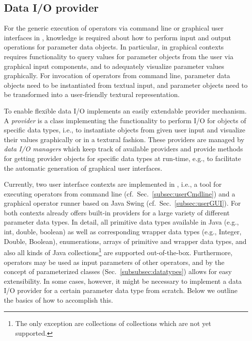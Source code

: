 \subsection{Data I/O provider}
For the generic execution of operators via command line or graphical user
interfaces in \alida, knowledge is required about how to perform input and
output operations for parameter data objects.
In particular, in graphical contexts \alida requires functionality to query 
values for parameter objects from the user via graphical input components, and
to adequately visualize parameter values graphically. For invocation of operators from 
command line, parameter data objects need to be instantiated from textual input,
and parameter objects need to be transformed into a user-friendly textural representation. 

To enable flexible data I/O \alida implements an easily extendable provider mechanism. 
A {\em provider} is a class implementing the functionality to perform I/O for
objects of specific data types, i.e., to instantiate objects from given user
input and visualize their values graphically or in a textural fashion. These
providers are managed by {\em data I/O managers} which keep track of available
providers and provide methods for getting provider objects for specific data
types at run-time, e.g., to facilitate the automatic generation of graphical user interfaces.

Currently, two user interface contexts are implemented in \alida, i.e., a tool
for executing operators from command line (cf.~Sec.~\ref{subsec:userCmdline})
and a graphical operator runner based on Java Swing (cf.~Sec.~\ref{subsec:userGUI}). For both contexts \alida already offers 
built-in providers for a large variety of different parameter data types. In detail, all primitive 
data types available in Java (e.g., int, double, boolean) as well as corresponding wrapper data 
types (e.g., Integer, Double, Boolean), enumerations, arrays of primitive and wrapper data types, 
and also all kinds of Java collections\footnote{The only exception are
collections of collections which are not yet supported.} are supported
out-of-the-box.
Furthermore, operators may be used as input parameters of other operators, and by the concept 
of parameterized classes (Sec.~\ref{subsubsec:datatypes}) \alida allows for easy extensibility. In some cases,
however, it might be necessary to implement a data I/O provider for a certain 
parameter data type from scratch. 
Below we outline the basics of how to accomplish this.
 
